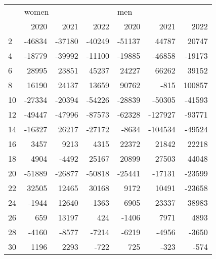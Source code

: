 \begin{tabular}{lrrrrrr}
\toprule
{} & \multicolumn{3}{l}{women} & \multicolumn{3}{l}{men} \\
{} &   2020 &   2021 &   2022 &   2020 &    2021 &    2022 \\
\midrule
2  & -46834 & -37180 & -40249 & -51137 &   44787 &   20747 \\
4  & -18779 & -39992 & -11100 & -19885 &  -46858 &  -19173 \\
6  &  28995 &  23851 &  45237 &  24227 &   66262 &   39152 \\
8  &  16190 &  24137 &  13659 &  90762 &    -815 &  100857 \\
10 & -27334 & -20394 & -54226 & -28839 &  -50305 &  -41593 \\
12 & -49447 & -47996 & -87573 & -62328 & -127927 &  -93771 \\
14 & -16327 &  26217 & -27172 &  -8634 & -104534 &  -49524 \\
16 &   3457 &   9213 &   4315 &  22372 &   21842 &   22218 \\
18 &   4904 &  -4492 &  25167 &  20899 &   27503 &   44048 \\
20 & -51889 & -26877 & -50818 & -25441 &  -17131 &  -23599 \\
22 &  32505 &  12465 &  30168 &   9172 &   10491 &  -23658 \\
24 &  -1944 &  12640 &  -1363 &   6905 &   23337 &   38983 \\
26 &    659 &  13197 &    424 &  -1406 &    7971 &    4893 \\
28 &  -4160 &  -8577 &  -7214 &  -6219 &   -4956 &   -3650 \\
30 &   1196 &   2293 &   -722 &    725 &    -323 &    -574 \\
\bottomrule
\end{tabular}
